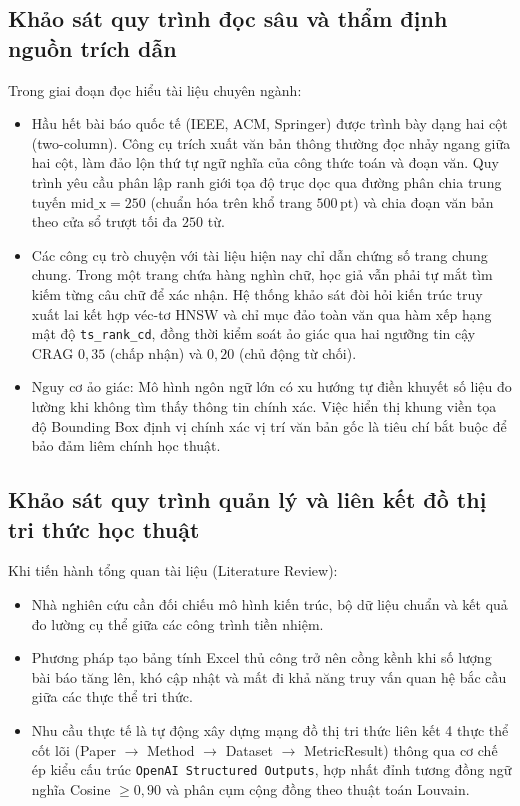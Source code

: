 \subsection{Khảo sát quy trình đọc sâu và thẩm định nguồn trích dẫn}
\label{subsec:khao_sat_doc_sau}
Trong giai đoạn đọc hiểu tài liệu chuyên ngành:
\begin{itemize}[noitemsep, topsep=2pt]
    \item Hầu hết bài báo quốc tế (IEEE, ACM, Springer) được trình bày dạng hai cột (two-column). Công cụ trích xuất văn bản thông thường đọc nhảy ngang giữa hai cột, làm đảo lộn thứ tự ngữ nghĩa của công thức toán và đoạn văn. Quy trình yêu cầu phân lập ranh giới tọa độ trục dọc qua đường phân chia trung tuyến $\text{mid\_x} = 250$ (chuẩn hóa trên khổ trang $500\,\text{pt}$) và chia đoạn văn bản theo cửa sổ trượt tối đa $250$ từ.
    \item Các công cụ trò chuyện với tài liệu hiện nay chỉ dẫn chứng số trang chung chung. Trong một trang chứa hàng nghìn chữ, học giả vẫn phải tự mắt tìm kiếm từng câu chữ để xác nhận. Hệ thống khảo sát đòi hỏi kiến trúc truy xuất lai kết hợp véc-tơ HNSW và chỉ mục đảo toàn văn qua hàm xếp hạng mật độ \texttt{ts\_rank\_cd}, đồng thời kiểm soát ảo giác qua hai ngưỡng tin cậy CRAG $0{,}35$ (chấp nhận) và $0{,}20$ (chủ động từ chối).
    \item Nguy cơ ảo giác: Mô hình ngôn ngữ lớn có xu hướng tự điền khuyết số liệu đo lường khi không tìm thấy thông tin chính xác. Việc hiển thị khung viền tọa độ Bounding Box định vị chính xác vị trí văn bản gốc là tiêu chí bắt buộc để bảo đảm liêm chính học thuật.
\end{itemize}

\subsection{Khảo sát quy trình quản lý và liên kết đồ thị tri thức học thuật}
\label{subsec:khao_sat_do_thi}
Khi tiến hành tổng quan tài liệu (Literature Review):
\begin{itemize}[noitemsep, topsep=2pt]
    \item Nhà nghiên cứu cần đối chiếu mô hình kiến trúc, bộ dữ liệu chuẩn và kết quả đo lường cụ thể giữa các công trình tiền nhiệm.
    \item Phương pháp tạo bảng tính Excel thủ công trở nên cồng kềnh khi số lượng bài báo tăng lên, khó cập nhật và mất đi khả năng truy vấn quan hệ bắc cầu giữa các thực thể tri thức.
    \item Nhu cầu thực tế là tự động xây dựng mạng đồ thị tri thức liên kết 4 thực thể cốt lõi (Paper $\rightarrow$ Method $\rightarrow$ Dataset $\rightarrow$ MetricResult) thông qua cơ chế ép kiểu cấu trúc \texttt{OpenAI Structured Outputs}, hợp nhất đỉnh tương đồng ngữ nghĩa Cosine $\ge 0{,}90$ và phân cụm cộng đồng theo thuật toán Louvain.
\end{itemize}

